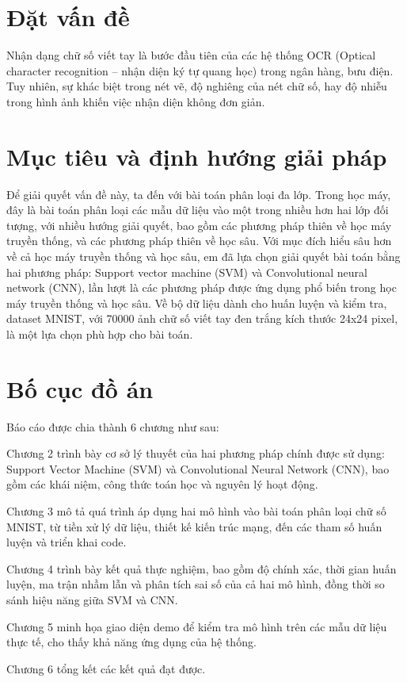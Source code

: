\documentclass[../DoAn.tex]{subfiles}
\begin{document}
\section{Đặt vấn đề}
\label{sec:dvd}
\indent Nhận dạng chữ số viết tay là bước đầu tiên của các hệ thống OCR (Optical character recognition – nhận diện ký tự quang học) trong ngân hàng, bưu điện. Tuy nhiên, sự khác biệt trong nét vẽ, độ nghiêng của nét chữ số, hay độ nhiễu trong hình ảnh khiến việc nhận diện không đơn giản. 

\section{Mục tiêu và định hướng giải pháp}
Để giải quyết vấn đề này, ta đến với bài toán phân loại đa lớp. Trong học máy, đây là bài toán phân loại các mẫu dữ liệu vào một trong nhiều hơn hai lớp đối tượng, với nhiều hướng giải quyết, bao gồm các phương pháp thiên về học máy truyền thống, và các phương pháp thiên về học sâu. Với mục đích hiểu sâu hơn về cả học máy truyền thống và học sâu, em đã lựa chọn giải quyết bài toán bằng hai phương pháp: Support vector machine (SVM) và Convolutional neural network (CNN), lần lượt là các phương pháp được ứng dụng phổ biến trong học máy truyền thống và học sâu. Về bộ dữ liệu dành cho huấn luyện và kiểm tra, dataset MNIST, với 70000 ảnh chữ số viết tay đen trắng kích thước 24x24 pixel, là một lựa chọn phù hợp cho bài toán. 

\section{Bố cục đồ án}

Báo cáo được chia thành 6 chương như sau:

Chương 2 trình bày cơ sở lý thuyết của hai phương pháp chính được sử dụng: Support Vector Machine (SVM) và Convolutional Neural Network (CNN), bao gồm các khái niệm, công thức toán học và nguyên lý hoạt động.

Chương 3 mô tả quá trình áp dụng hai mô hình vào bài toán phân loại chữ số MNIST, từ tiền xử lý dữ liệu, thiết kế kiến trúc mạng, đến các tham số huấn luyện và triển khai code.

Chương 4 trình bày kết quả thực nghiệm, bao gồm độ chính xác, thời gian huấn luyện, ma trận nhầm lẫn và phân tích sai số của cả hai mô hình, đồng thời so sánh hiệu năng giữa SVM và CNN.

Chương 5 minh họa giao diện demo để kiểm tra mô hình trên các mẫu dữ liệu thực tế, cho thấy khả năng ứng dụng của hệ thống.

Chương 6 tổng kết các kết quả đạt được.
\end{document}
